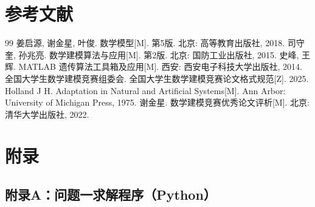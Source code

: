 \documentclass[a4paper]{ctexart}
\begin{document}
\section*{参考文献}

\begin{thebibliography}{99}
 姜启源, 谢金星, 叶俊. 数学模型[M]. 第5版. 北京: 高等教育出版社, 2018.
 司守奎, 孙兆亮. 数学建模算法与应用[M]. 第2版. 北京: 国防工业出版社, 2015.
 史峰, 王辉. MATLAB 遗传算法工具箱及应用[M]. 西安: 西安电子科技大学出版社, 2014.
 全国大学生数学建模竞赛组委会. 全国大学生数学建模竞赛论文格式规范[Z]. 2025.
 Holland J H. Adaptation in Natural and Artificial Systems[M]. Ann Arbor: University of Michigan Press, 1975.
 谢金星. 数学建模竞赛优秀论文评析[M]. 北京: 清华大学出版社, 2022.
\end{thebibliography}

\section*{附录}

\subsection*{附录A：问题一求解程序（Python）}
\end{document}
